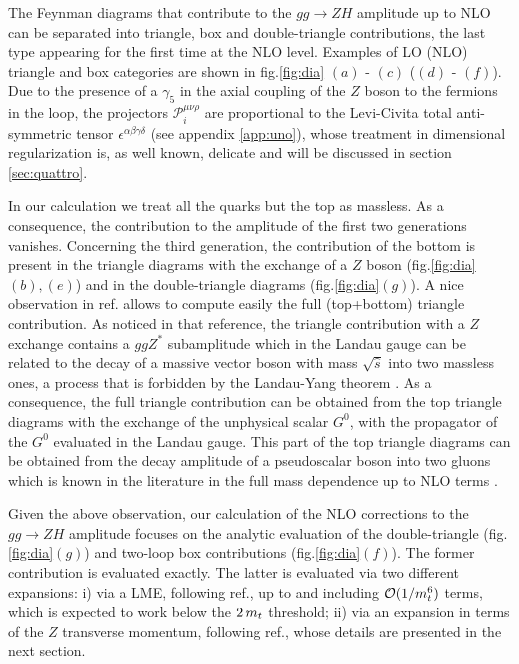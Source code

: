 The Feynman diagrams that contribute to the $gg \to  ZH$ amplitude up to NLO
can be separated into triangle, box and double-triangle
contributions, the last type appearing for the first time at the
NLO level. Examples of LO (NLO) triangle and box
categories are shown in fig.\ref{fig:dia} $(a)$ - $(c)$
($(d)$ - $(f)$).
Due to the presence of a $\gamma_5$ in the axial coupling of the $Z$ boson to
the fermions in the loop, the projectors $\mathcal{P}_i^{\mu\nu\rho}$ are
proportional to the Levi-Civita total anti-symmetric tensor
$\epsilon^{\alpha\beta\gamma\delta}$ (see appendix \ref{app:uno}),
whose treatment in dimensional regularization is, as well known, delicate
and will be discussed in section \ref{sec:quattro}.

In our calculation we treat all the quarks but the top as massless.
As a consequence, the contribution to the amplitude of the first two generations
vanishes. Concerning the third generation, the contribution of the bottom
is present  in the triangle diagrams with the exchange of a $Z$ boson
(fig.\ref{fig:dia}$(b),(e)$) and in the double-triangle diagrams
(fig.\ref{fig:dia}$(g)$).
A nice observation in ref.\cite{Altenkamp:2012sx} allows to compute
easily the full (top+bottom) triangle contribution. As noticed in that
reference,
the triangle contribution with a $Z$ exchange contains a $ggZ^*$ subamplitude
which in the Landau gauge can be related to the decay of a massive vector boson
with mass $\sqrt{\hat{s}}$ into two massless ones, a process that is
forbidden by
the Landau-Yang theorem \cite{Landau:1948kw,Yang:1950rg}. As a consequence,
the full triangle contribution can be obtained from the top triangle diagrams
with the exchange of the unphysical scalar $G^0$, with the propagator of the
$G^0$ evaluated in the Landau gauge. This part of the top triangle
diagrams  can be obtained from the decay
amplitude of a pseudoscalar boson into two gluons which is  known in
the literature in the full mass dependence up to NLO terms \cite{Spira:1995rr,Aglietti:2006tp}. 

Given the above observation, our calculation of the NLO corrections to
the $gg \to ZH$ amplitude focuses on the analytic evaluation of the
double-triangle (fig.\ref{fig:dia}$(g)$) and two-loop box contributions
(fig.\ref{fig:dia}$(f)$). The former contribution is evaluated exactly.
The latter is evaluated via two different expansions: i) via  a LME, following
ref.\cite{Degrassi:2010eu}, up to and including ${\cal O}(1/m_t^6)$ terms,
which is expected to work below the $2\, m_t$ threshold; ii) via an expansion in
terms of the $Z$ transverse momentum, following ref.\cite{Bonciani:2018omm},
whose details are presented in the next section.

